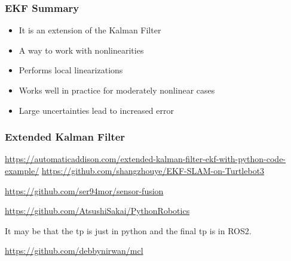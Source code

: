 \begin{frame}
    \frametitle{EKF Summary}
    
    \begin{itemize}
    \item It is an extension of the Kalman Filter
    \item A way to work with nonlinearities
    \item Performs local linearizations
    \item Works well in practice for moderately nonlinear cases
    \item Large uncertainties lead to increased error
    \end{itemize}
    
\end{frame}
    
\begin{frame}
    \frametitle{Extended Kalman Filter}
    
    
    \footnotesize 
    \url{https://automaticaddison.com/extended-kalman-filter-ekf-with-python-code-example/}
     \url{https://github.com/shangzhouye/EKF-SLAM-on-Turtlebot3}
    
     \url{https://github.com/ser94mor/sensor-fusion}
    
     \url{https://github.com/AtsushiSakai/PythonRobotics}
    
     It may be that the tp is just in python and the final tp is in ROS2.
    
     \url{https://github.com/debbynirwan/mcl}

\end{frame}
